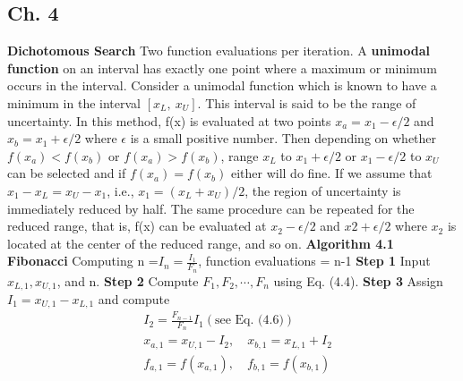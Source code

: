 \begin{multicols}{3}
\section{Ch. 4}
\textbf{Dichotomous Search} \newline
Two function evaluations per iteration. \newline
A \textbf{unimodal function} on an interval has exactly
one point where a maximum or minimum
occurs in the interval. \newline 
Consider a unimodal function which is known to have a minimum in the interval $[x_L, \ x_U]$. This interval is said to be the range of uncertainty. \newline 
In this method, f(x) is evaluated at two points $x_a =
x_1 - \epsilon/2$ and $x_b = x_1 +\epsilon/2$ where $\epsilon$ is a small positive number. Then depending
on whether $f(x_a) < f(x_b)$ or $f(x_a) > f(x_b)$, range $x_L$ to $x_1 + \epsilon/2$ or $x_1 - \epsilon/2$
to $x_U$ can be selected and if $f(x_a) = f(x_b)$ either will do fine. If we assume
that $x_1 - x_L = x_U - x_1$, i.e., $x_1 = (x_L + x_U)/2$, the region of uncertainty
is immediately reduced by half. The same procedure can be repeated for the
reduced range, that is, f(x) can be evaluated at $x_2 - \epsilon/2$ and $x2 + \epsilon/2$ where $x_2$ is located at the center of the reduced range, and so on. \newline \newline 
\textbf{Algorithm 4.1 Fibonacci} \newline
Computing n =$I_n=\frac{I_1}{F_n}$, function evaluations = n-1 \newline
\textbf{Step 1} \newline
Input $x_{L,1}, x_{U,1}$, and n. \newline
\textbf{Step 2} \newline
Compute $F_1, F_2, \cdots, F_n$ using Eq. (4.4). \newline
\textbf{Step 3} \newline
Assign $I_1 = x_{U,1} - x_{L,1}$ and compute
\begin{align*}
& I_2 = \frac{F_{n -1}}{F_n}I_1 (\text{see Eq. (4.6)})\\
& x_{a,1} = x_{U,1} - I_2, \quad x_{b,1} = x_{L,1} + I_2\\ 
& f_{a,1} = f(x_{a,1}), \quad f_{b,1} = f(x_{b,1})
\end{align*}

\end{multicols}
